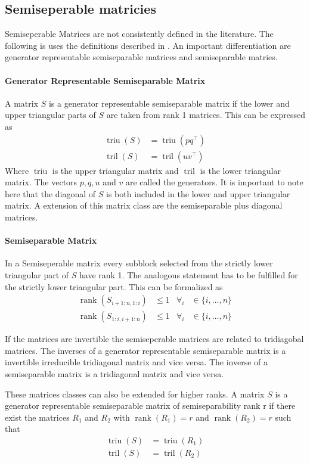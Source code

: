 \documentclass[doctype=mastersthesis,BCOR=15mm,biblatex]{ldvbook}%
\DeclareMathOperator{\rank}{rank}
\DeclareMathOperator{\triu}{triu}
\DeclareMathOperator{\tril}{tril}
\begin{document}
\subsection{Semiseperable matricies}
Semiseperable Matrices are not consistently defined in the literature. The following is uses the definitions described in \cite{vandebril_bibliography_2005,}.
An important differentiation are generator representable semiseparable matrices and semiseparable matries.
\paragraph{Generator Representable Semiseparable Matrix}
A matrix $S$ is a generator representable semiseparable matrix if the lower and upper triangular parts of $S$ are taken from rank 1 matrices.
This can be expressed as 
\begin{align}
	\triu(S) &= \triu(pq^\top)\\
	\tril(S) &= \tril(uv^\top)
\end{align}
Where $\triu$ is the upper triangular matrix and $\tril$ is the lower triangular matrix. The vectors $p,q,u$ and $v$ are called the generators.
It is important to note here that the diagonal of $S$ is both included in the lower and upper triangular matrix.
A extension of this matrix class are the semiseparable plus diagonal matrices.  


\paragraph{Semiseparable Matrix}
In a Semiseperable matrix every subblock selected from the strictly lower triangular part of $S$ have rank 1. The analogous statement has to be fulfilled for the strictly lower triangular part.
This can be formalized as 
\begin{align}
	\rank(S_{i+1:n,1:i}) &\leq 1 & \forall_i &\in\{i,\dots,n\}\\
	\rank(S_{1:i,i+1:n}) &\leq 1 & \forall_i &\in\{i,\dots,n\}
\end{align}

If the matrices are invertible the semiseperable matrices are related to tridiagobal matrices.
The inverses of a generator representable semiseparable matrix is a invertible irreducible tridiagonal matrix and vice versa. 
The inverse of a semiseparable matrix is a tridiagonal matrix and vice versa.

These matrices classes can also be extended for higher ranks.
A matrix $S$ is a generator representable semiseparable matrix of semiseparability rank r if there exist the matrices $R_1$ and $R_2$ with $\rank(R_1)=r$ and $\rank(R_2)=r$ such that
\begin{align}
\triu(S) &= \triu(R_1)\\
\tril(S) &= \tril(R_2)
\end{align}
\end{document}
